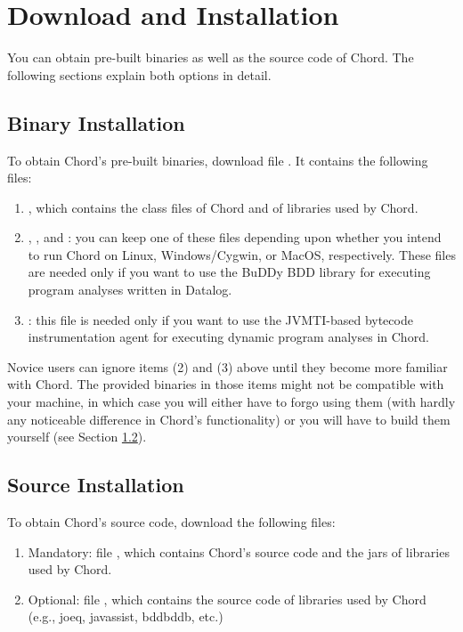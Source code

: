 \section{Download and Installation}
\label{sec:download-and-installation}

You can obtain pre-built binaries as well as the source code of Chord.
The following sections explain both options in detail.

\subsection {Binary Installation}
\label{sec:binary-install}

To obtain Chord's pre-built binaries, download file .
It contains the following files:

\begin{enumerate}
\item
{}, which contains the class files of Chord and of libraries used by Chord.
\item
{}, , and : you can keep one of these files
depending upon whether you intend to run Chord on Linux, Windows/Cygwin, or MacOS, respectively.
These files are needed only if you want to use the BuDDy BDD library for executing program
analyses written in Datalog.
\item
{}: this file is needed only if you want to use the JVMTI-based bytecode
instrumentation agent for executing dynamic program analyses in Chord.
\end{enumerate}

Novice users can ignore items (2) and (3) above until they become more familiar with Chord.
The provided binaries in those items might not be compatible with your machine, in which case you
will either have to forgo using them (with hardly any noticeable difference in Chord's functionality)
or you will have to build them yourself (see Section \ref{sec:source-install}).

\subsection{Source Installation}
\label{sec:source-install}

To obtain Chord's source code, download the following files:

\begin{enumerate}
\item
Mandatory: file , which contains Chord's source code and the jars of libraries used by Chord.
\item
Optional: file , which contains the source
code of libraries used by Chord (e.g., joeq, javassist, bddbddb, etc.)
\end{enumerate}

